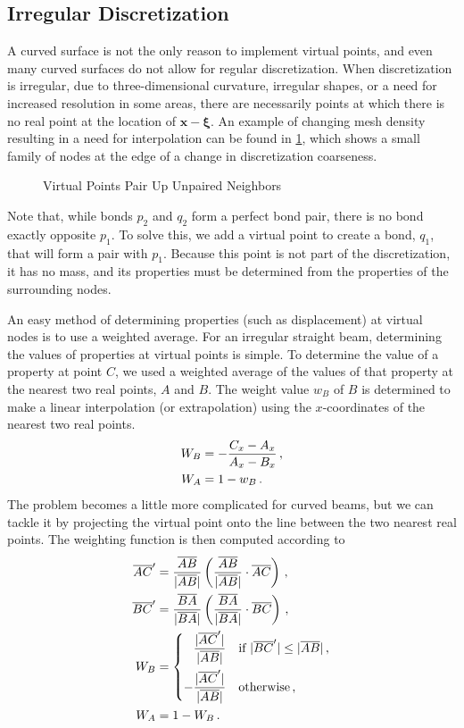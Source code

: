 \subsection{Irregular Discretization}
A curved surface is not the only reason to implement virtual points, and even many curved surfaces do not allow for regular discretization.
When discretization is irregular, due to three-dimensional curvature, irregular shapes, or a need for increased resolution in some areas, there are necessarily points at which there is no real point at the location of $\mathbf{x} - \boldsymbol{\xi}$.
An example of changing mesh density resulting in a need for interpolation can be found in \cref{fig:virtualpoint}, which shows a small family of nodes at the edge of a change in discretization coarseness.
%
\begin{figure}[htbp]
  \vspace{10mm}
  \centering
  
  \caption{Virtual Points Pair Up Unpaired Neighbors}
  \label{fig:virtualpoint}
\end{figure}
%
Note that, while bonds \(p_2\) and \(q_2\) form a perfect bond pair, there is no bond exactly opposite \(p_1\).
To solve this, we add a virtual point to create a bond, \(q_1\), that will form a pair with \(p_1\).
Because this point is not part of the discretization, it has no mass, and its properties must be determined from the properties of the surrounding nodes.

An easy method of determining properties (such as displacement) at virtual nodes is to use a weighted average.
For an irregular straight beam, determining the values of properties at virtual points is simple. 
To determine the value of a property at point $C$, we used a weighted average of the values of that property at the nearest two real points, $A$ and $B$.
The weight value $w_B$ of $B$ is determined to make a linear interpolation (or extrapolation) using the $x$-coordinates of the nearest two real points.
\begin{align}
W_B &= -\frac{C_x-A_x}{A_x-B_x}\, ,\notag\\
W_A &= 1-w_B\, .\notag
\end{align}
The problem becomes a little more complicated for curved beams, but we can tackle it by projecting the virtual point onto the line between the two nearest real points.
The weighting function is then computed according to
\begin{align}
\overline{AC}' &= \frac{\overline{AB}}{|\overline{AB}|}\left(\frac{\overline{AB}}{|\overline{AB}|} \cdot \overline{AC}\right)\, ,\notag\\
\overline{BC}' &= \frac{\overline{BA}}{|\overline{BA}|}\left(\frac{\overline{BA}}{|\overline{BA}|}\cdot\overline{BC}\right)\, ,\notag\\
W_B &= 
  \begin{dcases}
    \phantom{-}\frac{|\overline{AC}'|}{|\overline{AB}|} & \text{if } |\overline{BC}'| \leq |\overline{AB}|\,,\\
    -\frac{|\overline{AC}'|}{|\overline{AB}|} &\text{otherwise}\,,
  \end{dcases}\notag\\
W_A &= 1-W_B \, .\notag
\end{align}

